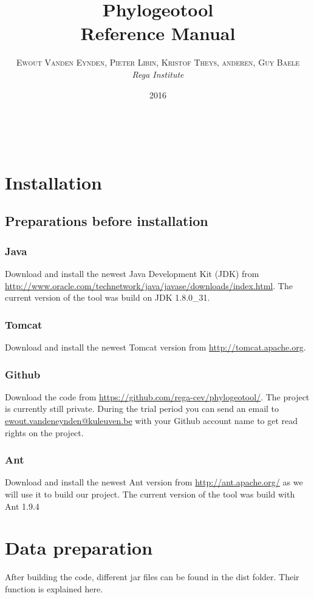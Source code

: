 \documentclass[a4paper, 11pt]{article} %
\title{\textbf{Phylogeotool}\\ %
Reference Manual} %
\author{\textsc{Ewout Vanden Eynden, Pieter Libin, Kristof Theys, anderen, Guy Baele} %
\\{\textit{Rega Institute}}} %
\date{2016} %
\makeatletter
\renewcommand{\maketitle}{ %
\begin{flushright} %
{\LARGE\@title} %

\vspace{50pt} %

{\large\@author} %
\\\@date %

\vspace{40pt} %
\end{flushright}
}
\makeatother
\begin{document}
\maketitle %

\vspace{30pt} %

\tableofcontents
\newpage

\section{Installation}
\subsection{Preparations before installation}
\subsubsection*{Java}
Download and install the newest Java Development Kit (JDK) from \url{http://www.oracle.com/technetwork/java/javase/downloads/index.html}.
The current version of the tool was build on JDK 1.8.0\_31.
\subsubsection*{Tomcat}
Download and install the newest Tomcat version from \url{http://tomcat.apache.org}.
\subsubsection*{Github}
Download the code from \url{https://github.com/rega-cev/phylogeotool/}. The project is currently still private. During the trial period you can send an email to \href{mailto:ewout.vandeneynden@kuleuven.be}  {ewout.vandeneynden@kuleuven.be} with your Github account name to get read rights on the project.
\subsubsection*{Ant}
Download and install the newest Ant version from \url{http://ant.apache.org/} as we will use it to build our project.
The current version of the tool was build with Ant 1.9.4

\section{Data preparation}
After building the code, different jar files can be found in the dist folder. Their function is explained here.
\end{document}
